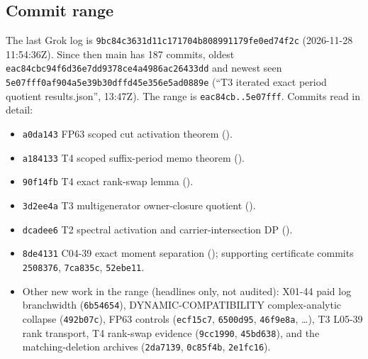 \documentclass[11pt]{article}
\begin{document}
\subsection*{Commit range}
The last Grok log is \texttt{9bc84c3631d11c171704b808991179fe0ed74f2c} (2026-11-28 11:54:36Z). Since then main has
187 commits, oldest \texttt{eac84cbc94f6d36e7dd9378ce4a4986ac26433dd} and newest seen
\texttt{5e07fff0af904a5e39b30dffd45e356e5ad0889e} (``T3 iterated exact period quotient results.json'', 13:47Z).
The range is \texttt{eac84cb..5e07fff}. Commits read in detail:
\begin{itemize}
\item \texttt{a0da143} FP63 scoped cut activation theorem ().
\item \texttt{a184133} T4 scoped suffix-period memo theorem ().
\item \texttt{90f14fb} T4 exact rank-swap lemma ().
\item \texttt{3d2ee4a} T3 multigenerator owner-closure quotient ().
\item \texttt{dcadee6} T2 spectral activation and carrier-intersection DP ().
\item \texttt{8de4131} C04-39 exact moment separation ();
supporting certificate commits \texttt{2508376}, \texttt{7ca835c}, \texttt{52ebe11}.
\item Other new work in the range (headlines only, not audited): X01-44 paid log branchwidth (\texttt{6b54654}), DYNAMIC-COMPATIBILITY complex-analytic
collapse (\texttt{492b07c}), FP63 controls (\texttt{ecf15c7}, \texttt{6500d95}, \texttt{46f9e8a}, \ldots), T3 L05-39 rank transport,
T4 rank-swap evidence (\texttt{9cc1990}, \texttt{45bd638}), and the matching-deletion archives (\texttt{2da7139}, \texttt{0c85f4b}, \texttt{2e1fc16}).
\end{itemize}
\end{document}
